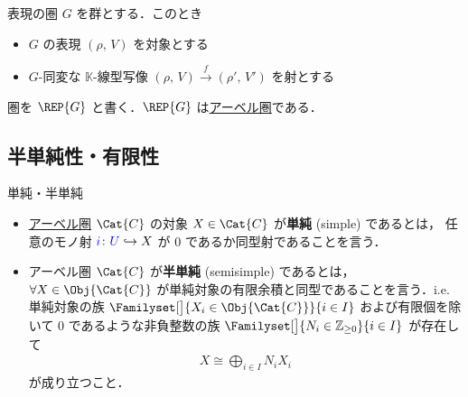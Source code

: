 \documentclass[TQFT_main]{subfiles}
\begin{document}
    \begin{myexample}[label=def:Rep]{表現の圏}
        $G$ を群とする．このとき
        \begin{itemize}
            \item $G$ の表現 $(\rho,\, V)$ を対象とする
            \item $G$-同変な $\mathbb{K}$-線型写像 $(\rho,\, V) \xrightarrow{f} (\rho',\, V')$ を射とする
        \end{itemize}
        圏を $\REP{G}$ と書く．$\REP{G}$ は\hyperref[def:additive-cat]{アーベル圏}である．
    \end{myexample}

    \subsection{半単純性・有限性}

    \begin{mydef}[label=def:semisimple-cat]{単純・半単純}
        \begin{itemize}
            \item \hyperref[def:additive-cat]{アーベル圏} $\Cat{C}$ の対象 $X \in \Cat{C}$ が\textbf{単純} (simple) であるとは，
            任意のモノ射 $\textcolor{blue}{i} \colon \textcolor{blue}{U} \hookrightarrow X$ が $0$ であるか同型射であることを言う．
            \item アーベル圏 $\Cat{C}$ が\textbf{半単純} (semisimple) であるとは，$\forall X \in \Obj{\Cat{C}}$ が単純対象の有限余積と同型であることを言う．i.e.
            単純対象の族 $\Familyset[\big]{X_i \in \Obj{\Cat{C}}}{i \in I}$ および有限個を除いて $0$ であるような非負整数の族 $\Familyset[\big]{N_i \in \mathbb{Z}_{\ge 0}}{i \in I}$ が存在して
            \begin{align}
                X \cong \bigoplus_{i \in I} N_i X_i
            \end{align}
            が成り立つこと．
        \end{itemize}
    \end{mydef}
\end{document}
